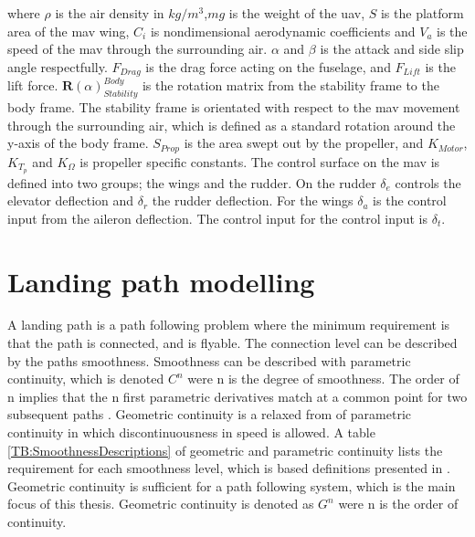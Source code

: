 where $\rho$ is the air density in $kg/m^3$,$mg$ is the weight of the \gls{uav}, $S$ is the platform area of the \gls{mav} wing, $C_i$ is nondimensional aerodynamic coefficients and $V_a$ is the speed of the \gls{mav} through the surrounding air. $\alpha$ and $\beta$ is the attack and side slip angle respectfully. $F_{Drag}$ is the drag force acting on the fuselage, and $F_{Lift}$ is the lift force. $\mathbf{R}(\alpha)_{Stability}^{Body}$ is the rotation matrix from the stability frame to the body frame. The stability frame is orientated with respect to the \gls{mav} movement through the surrounding air, which is defined as a standard rotation around the y-axis of the body frame. $S_{Prop}$ is the area swept out by the propeller, and $K_{Motor}$,$K_{T_p}$ and $K_\Omega$ is propeller specific constants. The control surface on the \gls{mav} is defined into two groups; the wings and the rudder. On the rudder $\delta_e$ controls the elevator deflection and $\delta_r$ the rudder deflection. For the wings $\delta_a$ is the control input from the aileron deflection. The control input for the control input is $\delta_t$.
\section{Landing path modelling}
A landing path is a path following problem where the minimum requirement is that the path is connected, and is flyable. The connection level can be described by the paths smoothness. Smoothness can be described with parametric continuity, which is denoted $C^n$ were n is the degree of smoothness. The order of n implies that the n first parametric derivatives match at a common point for two subsequent paths \citep{barsky1989geometric}. Geometric continuity is a relaxed from of parametric continuity in which discontinuousness in speed is allowed. A table \ref{TB:SmoothnessDescriptions} of geometric and parametric continuity lists the requirement for each smoothness level, which is based definitions presented in \citep{barsky1989geometric}.
Geometric continuity is sufficient for a path following system, which is the main focus of this thesis. Geometric continuity is denoted as $G^n$ were n is the order of continuity.

